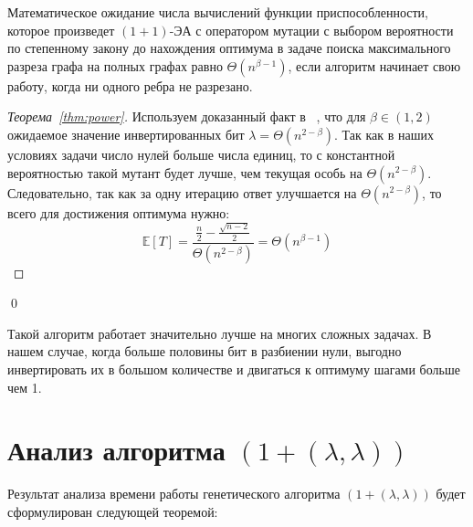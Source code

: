 \documentclass[times]{itmo-student-thesis}
\newcommand{\alglambda}{${(1 + (\lambda , \lambda))}$\xspace}
\newcommand{\oea}{\mbox{$(1 + 1)$-ЭА}\xspace}
\begin{document}
\begin{theorem} \label{thm:power}
  Математическое ожидание числа вычислений функции приспособленности, которое произведет \oea с оператором мутации с выбором вероятности по степенному закону до нахождения оптимума в задаче поиска максимального разреза графа на полных графах равно $\Theta(n^{\beta-1})$, если алгоритм начинает свою работу, когда ни одного ребра не разрезано.
\end{theorem}

\begin{proof}[Теорема~\ref{thm:power}]
Используем доказанный факт в ~\cite{ссылка}, что для $\beta \in (1, 2)$ ожидаемое значение инвертированных бит $\lambda = \Theta(n^{2-\beta})$.
Так как в наших условиях задачи число нулей больше числа единиц, то с константной вероятностью такой мутант будет лучше, чем текущая особь на $\Theta(n^{2-\beta})$. Следовательно, так как за одну итерацию ответ улучшается на $\Theta(n^{2-\beta})$, то всего для достижения оптимума нужно:
$$
\mathbb{E}[T] = \frac{\frac{n}{2} - \frac{\sqrt{n-2}}{2}}{\Theta(n^{2-\beta})} = \Theta(n^{\beta - 1})
$$


\end{proof}\qed

Такой алгоритм работает значительно лучше на многих сложных задачах.
В нашем случае, когда больше половины бит в разбиении нули, выгодно инвертировать их в большом количестве и двигаться к оптимуму шагами больше чем 1.

\section{Анализ алгоритма \alglambda}
Результат анализа времени работы генетического алгоритма \alglambda будет сформулирован следующей теоремой:
\end{document}
